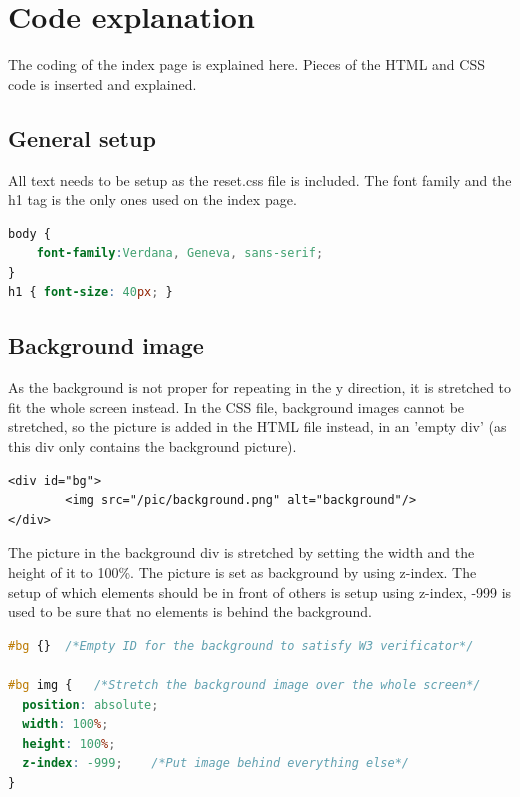 \section{Code explanation}
The coding of the index page is explained here. Pieces of the HTML and CSS code is inserted and explained.
\subsection{General setup}
All text needs to be setup as the reset.css file is included. The font family and the h1 tag is the only ones used on the index page. 
\begin{lstlisting}[language=CSS]
body {
	font-family:Verdana, Geneva, sans-serif;
}
h1 { font-size: 40px; }
\end{lstlisting}

\subsection{Background image}
As the background is not proper for repeating in the y direction, it is stretched to fit the whole screen instead. In the CSS file, background images cannot be stretched, so the picture is added in the HTML file instead, in an 'empty div' (as this div only contains the background picture).
\begin{lstlisting}
<div id="bg">
		<img src="/pic/background.png" alt="background"/>
</div>
\end{lstlisting}
The picture in the background div is stretched by setting the width and the height of it to 100\%. The picture is set as background by using z-index. The setup of which elements should be in front of others is setup using z-index, -999 is used to be sure that no elements is behind the background.
\begin{lstlisting}[language=CSS] 
#bg {}	/*Empty ID for the background to satisfy W3 verificator*/
		
#bg img {	/*Stretch the background image over the whole screen*/
  position: absolute;
  width: 100%;
  height: 100%;
  z-index: -999;	/*Put image behind everything else*/
}
\end{lstlisting}

